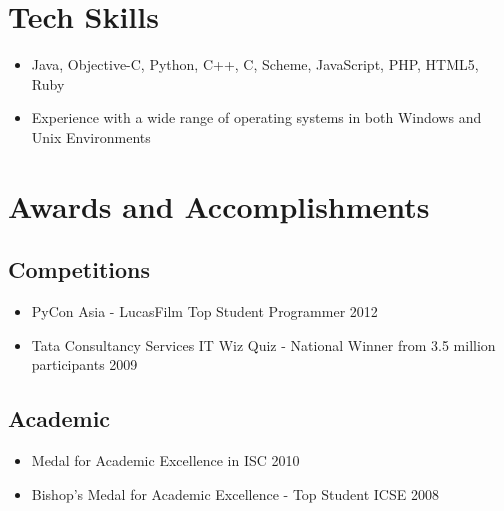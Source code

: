 \documentclass[11pt,a4paper]{moderncv}
\begin{document}
\section{Tech Skills}
\begin{itemize}
\item Java, Objective-C, Python, C++, C, Scheme, JavaScript, PHP, HTML5, Ruby
\item Experience with a wide range of operating systems in both Windows and Unix Environments
\end{itemize}
\section{Awards and Accomplishments}
\subsection{Competitions}
\begin{itemize}
    \item PyCon Asia - LucasFilm Top Student Programmer                                         \hfill 2012
    \item Tata Consultancy Services IT Wiz Quiz - National Winner from 3.5 million participants \hfill 2009
\end{itemize}
\subsection{Academic}
\begin{itemize}
\item Medal for Academic Excellence in ISC \hfill 2010
\item Bishop's Medal for Academic Excellence - Top Student ICSE \hfill 2008
\end{itemize}
\end{document}
